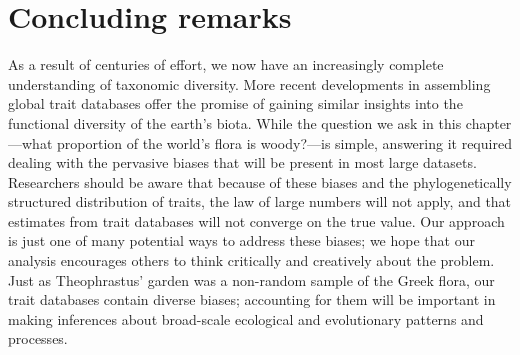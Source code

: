 \section{Concluding remarks}

As a result of centuries of effort, we now have an increasingly
complete understanding of taxonomic diversity.  More recent
developments in assembling global trait databases offer the promise of
gaining similar insights into the functional diversity of the earth's
biota.
%
While the question we ask in this chapter---what proportion of the
world's flora is woody?---is simple, answering it required dealing
with the pervasive biases that will be present in most large datasets.
%
Researchers should be aware that because of these biases and the
phylogenetically structured distribution of traits, the law of large
numbers will not apply, and that estimates from trait databases will
not converge on the true value.
%
Our approach is just one of many potential ways to address these
biases; we hope that our analysis encourages others to think
critically and creatively about the problem.
%
Just as Theophrastus' garden was a non-random sample of the Greek
flora, our trait databases contain diverse biases; accounting for them
will be important in making inferences about broad-scale ecological
and evolutionary patterns and processes.


